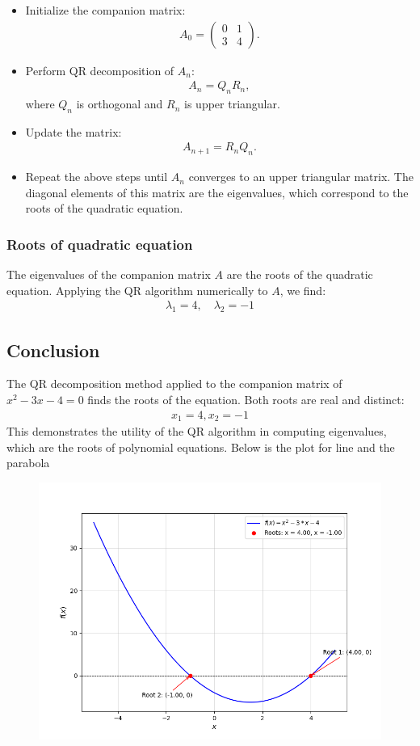 \documentclass{beamer}
\theoremstyle{remark}
\newcommand{\myvec}[1]{\ensuremath{\begin{pmatrix}#1\end{pmatrix}}}
\numberwithin{equation}{section}
\begin{document}
\begin{frame}

  \begin{itemize}
    \item Initialize the companion matrix:
    \begin{align}
        A_0 = 
        \myvec{
            0 & 1 \\
            3 & 4
        }.
    \end{align}
    \item Perform QR decomposition of $A_n$:
    \begin{align}
        A_n = Q_n R_n,
    \end{align}
    where $Q_n$ is orthogonal and $R_n$ is upper triangular.
    \item Update the matrix:
    \begin{align}
        A_{n+1} = R_n Q_n.
    \end{align}
    \item Repeat the above steps until $A_n$ converges to an upper triangular matrix. The diagonal elements of this matrix are the eigenvalues, which correspond to the roots of the quadratic equation.
    \end{itemize}
\end{frame}
\begin{frame}
    \frametitle{Roots of quadratic equation}
    The eigenvalues of the companion matrix $A$ are the roots of the quadratic equation. Applying the QR algorithm numerically to $A$, we find:
\begin{align}
    \lambda_1 = 4, \quad \lambda_2 = -1
\end{align}

\subsection*{Conclusion}
The QR decomposition method applied to the companion matrix of $x^2-3x-4= 0$ finds the roots of the equation. Both roots are real and distinct:
\begin{align}
    x_1 =4,x_2=-1
\end{align}
This demonstrates the utility of the QR algorithm in computing eigenvalues, which are the roots of polynomial equations.
Below is the plot for line and the parabola
\end{frame}
\begin{frame}
\begin{figure}[h!]
	\centering
	\includegraphics[width=1\columnwidth]{fig.png}
	\label{stemplot}
\end{figure}
    
\end{frame}
\end{document}
